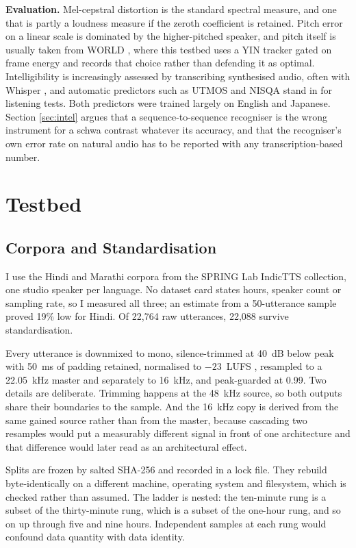 \documentclass[runningheads]{llncs}
\begin{document}
\textbf{Evaluation.} Mel-cepstral distortion \cite{kubichek1993mcd} is the
standard spectral measure, and one that is partly a loudness measure if the
zeroth coefficient is retained. Pitch error on a linear scale is dominated by
the higher-pitched speaker, and pitch itself is usually taken from WORLD
\cite{morise2016world}, where this testbed uses a YIN tracker gated on frame
energy and records that choice rather than defending it as optimal. Intelligibility is increasingly assessed by
transcribing synthesised audio, often with Whisper
\cite{radford2023whisper}, and automatic predictors such as UTMOS
\cite{saeki2022utmos} and NISQA \cite{mittag2021nisqa} stand in for listening
tests. Both predictors were trained largely on English and Japanese. Section
\ref{sec:intel} argues that a sequence-to-sequence recogniser is the wrong
instrument for a schwa contrast whatever its accuracy, and that the
recogniser's own error rate on natural audio has to be reported with any
transcription-based number.

\section{Testbed}

\subsection{Corpora and Standardisation}

I use the Hindi and Marathi corpora from the SPRING Lab IndicTTS collection,
one studio speaker per language. No dataset card states hours, speaker count
or sampling rate, so I measured all three; an estimate from a 50-utterance
sample proved 19\% low for Hindi. Of 22{,}764 raw utterances, 22{,}088 survive
standardisation.

Every utterance is downmixed to mono, silence-trimmed at 40~dB below peak with
50~ms of padding retained, normalised to $-23$~LUFS \cite{itu2015bs1770},
resampled to a 22.05~kHz master and separately to 16~kHz, and peak-guarded at
0.99. Two details are deliberate. Trimming happens at the 48~kHz source, so
both outputs share their boundaries to the sample. And the 16~kHz copy is
derived from the same gained source rather than from the master, because
cascading two resamples would put a measurably different signal in front of
one architecture and that difference would later read as an architectural
effect.

Splits are frozen by salted SHA-256 and recorded in a lock file. They rebuild
byte-identically on a different machine, operating system and filesystem, which
is checked rather than assumed. The ladder is nested: the ten-minute rung is a
subset of the thirty-minute rung, which is a subset of the one-hour rung, and
so on up through five and nine hours. Independent samples at each rung would
confound data quantity with data identity.
\end{document}
